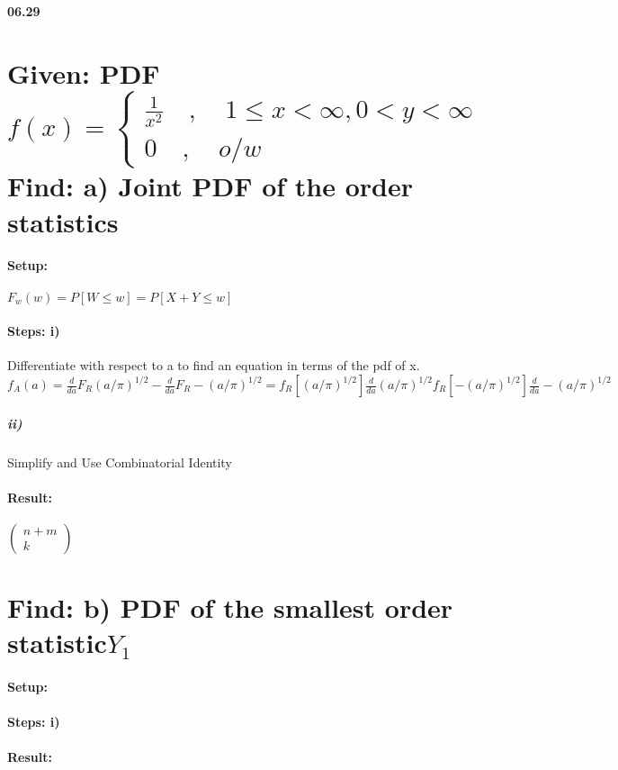 {\bf 06.29}

\section*{Given: PDF $f(x)=\begin{cases} \frac{1}{{ x }^{ 2 }}\quad ,\quad 1 \le x<\infty ,0<y<\infty  \\ 0\quad ,\quad o/w \end{cases}$\\ Find: a) Joint PDF of the order statistics}

\paragraph{Setup:}  ${F}_{w}(w)=P[W\le w]=P[X+Y\le w]$

\paragraph{Steps: i)} Differentiate with respect to a to find an equation in terms of the pdf of x.\\ ${f}_{A}(a)=\frac{d}{da}{F}_{R}(a/\pi)^{1/2}-\frac{d}{da}{F}_{R}-(a/\pi)^{1/2}= {f}_{R}[(a/\pi)^{1/2}]\frac{d}{da}(a/\pi)^{1/2} {f}_{R}[-(a/\pi)^{1/2}]\frac{d}{da}-(a/\pi)^{1/2}$

\subparagraph{ii)} Simplify and Use Combinatorial Identity

\paragraph{Result:} $\left( \begin{matrix} n+m \\ k \end{matrix} \right) $

\section*{Find: b) PDF of the smallest order statistic${Y}_{1}$ }

\paragraph{Setup:} 

\paragraph{Steps: i)} 


\paragraph{Result:} 

